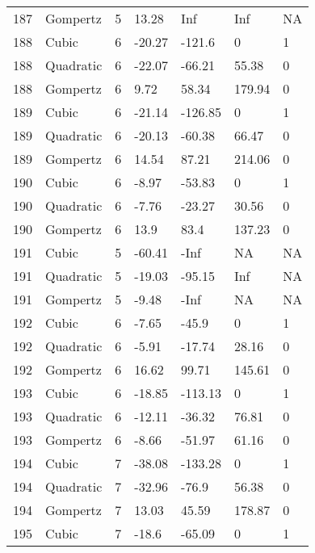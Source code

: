 \documentclass[11pt]{article}
\begin{document}
\begin{center}
\begin{longtable}{lllllll}
    187 & Gompertz  & 5               & 13.28   & Inf     & Inf     & NA   \\
    188 & Cubic     & 6               & -20.27  & -121.6  & 0       & 1    \\
    188 & Quadratic & 6               & -22.07  & -66.21  & 55.38   & 0    \\
    188 & Gompertz  & 6               & 9.72    & 58.34   & 179.94  & 0    \\
    189 & Cubic     & 6               & -21.14  & -126.85 & 0       & 1    \\
    189 & Quadratic & 6               & -20.13  & -60.38  & 66.47   & 0    \\
    189 & Gompertz  & 6               & 14.54   & 87.21   & 214.06  & 0    \\
    190 & Cubic     & 6               & -8.97   & -53.83  & 0       & 1    \\
    190 & Quadratic & 6               & -7.76   & -23.27  & 30.56   & 0    \\
    190 & Gompertz  & 6               & 13.9    & 83.4    & 137.23  & 0    \\
    191 & Cubic     & 5               & -60.41  & -Inf    & NA      & NA   \\
    191 & Quadratic & 5               & -19.03  & -95.15  & Inf     & NA   \\
    191 & Gompertz  & 5               & -9.48   & -Inf    & NA      & NA   \\
    192 & Cubic     & 6               & -7.65   & -45.9   & 0       & 1    \\
    192 & Quadratic & 6               & -5.91   & -17.74  & 28.16   & 0    \\
    192 & Gompertz  & 6               & 16.62   & 99.71   & 145.61  & 0    \\
    193 & Cubic     & 6               & -18.85  & -113.13 & 0       & 1    \\
    193 & Quadratic & 6               & -12.11  & -36.32  & 76.81   & 0    \\
    193 & Gompertz  & 6               & -8.66   & -51.97  & 61.16   & 0    \\
    194 & Cubic     & 7               & -38.08  & -133.28 & 0       & 1    \\
    194 & Quadratic & 7               & -32.96  & -76.9   & 56.38   & 0    \\
    194 & Gompertz  & 7               & 13.03   & 45.59   & 178.87  & 0    \\
    195 & Cubic     & 7               & -18.6   & -65.09  & 0       & 1    \\

\end{longtable}
\end{center}
\end{document}
